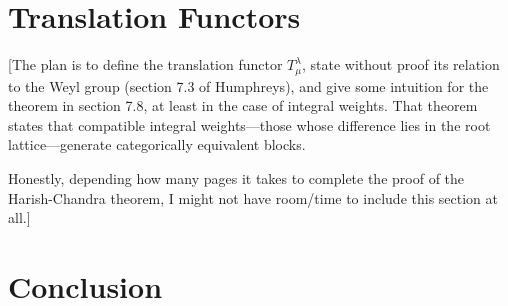 \documentclass[11pt]{article}
\begin{document}
\section{Translation Functors}
\label{sec:translation functors}

[The plan is to define the translation functor $T^\lambda_\mu$, state without
	proof its relation to the Weyl group (section 7.3 of Humphreys), and give some
	intuition for the theorem in section 7.8, at least in the case of integral
	weights. That theorem states that compatible integral
	weights---those whose difference lies in the root lattice---generate
	categorically equivalent blocks.

	Honestly, depending how many pages it takes to complete the proof of the
	Harish-Chandra theorem, I might not have room/time to include this section at
	all.]

\section{Conclusion}
\label{sec:conclusion}



\nocite{*}
\printbibliography
\end{document}
